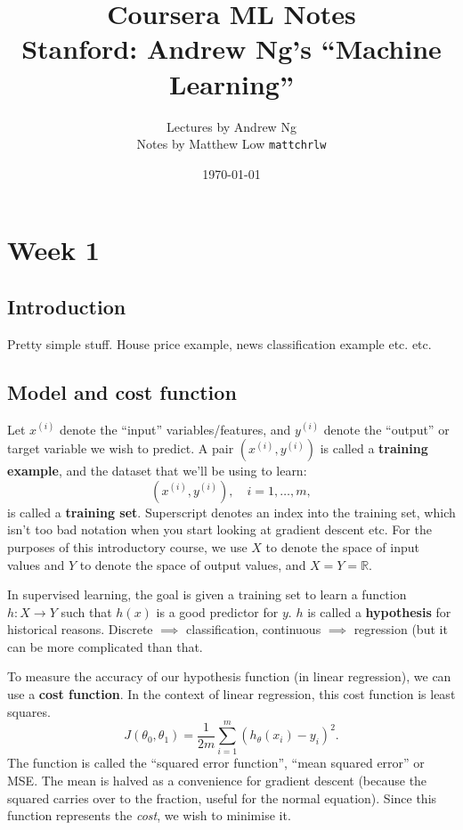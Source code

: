 \documentclass[a4paper, 12pt, oneside]{scrartcl}
\title{Coursera ML Notes\\\large Stanford: Andrew Ng's ``Machine Learning''}
\author{Lectures by Andrew Ng\\Notes by Matthew Low \texttt{mattchrlw}}
\date{\today}
\begin{document}
\maketitle

\tableofcontents

\section{Week 1}

\subsection{Introduction}
Pretty simple stuff. House price example, news classification example etc. etc.

\subsection{Model and cost function}
Let $x^{(i)}$ denote the ``input'' variables/features, and $y^{(i)}$ denote the ``output'' or target variable we wish to predict. A pair $(x^{(i)}, y^{(i)})$ is called a \textbf{training example}, and the dataset that we'll be using to learn:
\[(x^{(i)}, y^{(i)}), \quad i = 1,\ldots, m,\]
is called a \textbf{training set}. Superscript denotes an index into the training set, which isn't too bad notation when you start looking at gradient descent etc. For the purposes of this introductory course, we use $X$ to denote the space of input values and $Y$ to denote the space of output values, and $X = Y = \mathbb R$.

In supervised learning, the goal is given a training set to learn a function $h: X \to Y$ such that $h(x)$ is a good predictor for $y$. $h$ is called a \textbf{hypothesis} for historical reasons. Discrete $\implies$ classification, continuous $\implies$ regression (but it can be more complicated than that.

To measure the accuracy of our hypothesis function (in linear regression), we can use a \textbf{cost function}. In the context of linear regression, this cost function is least squares.
\[J(\theta_0, \theta_1) = \frac{1}{2m} \sum_{i=1}^m (h_\theta(x_i) - y_i)^2.\]
The function is called the ``squared error function'', ``mean squared error'' or MSE. The mean is halved as a convenience for gradient descent (because the squared carries over to the fraction, useful for the normal equation). Since this function represents the \textit{cost}, we wish to minimise it.
\end{document}
